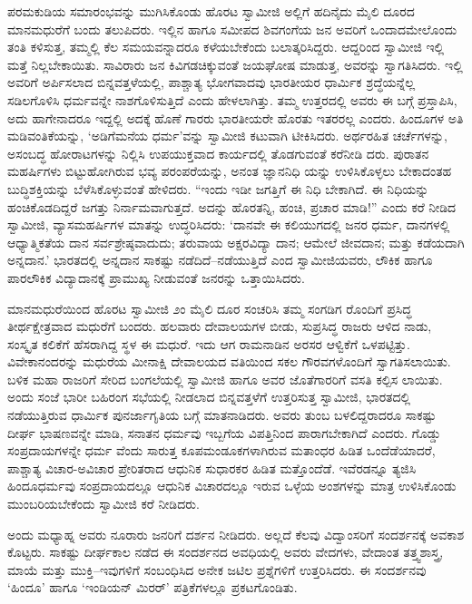 ಪರಮಕುಡಿಯ ಸಮಾರಂಭವನ್ನು ಮುಗಿಸಿಕೊಂಡು ಹೊರಟ ಸ್ವಾಮೀಜಿ ಅಲ್ಲಿಗೆ ಹದಿನೈದು ಮೈಲಿ ದೂರದ ಮಾನಮಧುರೆಗೆ ಬಂದು ತಲುಪಿದರು. ಇಲ್ಲಿನ ಹಾಗೂ ಸಮೀಪದ ಶಿವಗಂಗೆಯ ಜನ ಅವರಿಗೆ ಒಂದಾದಮೇಲೊಂದು ತಂತಿ ಕಳಿಸುತ್ತ, ತಮ್ಮಲ್ಲಿ ಕೆಲ ಸಮಯವನ್ನಾದರೂ ಕಳೆಯಬೇಕೆಂದು ಬಲಾತ್ಕರಿಸಿದ್ದರು. ಆದ್ದರಿಂದ ಸ್ವಾಮೀಜಿ ಇಲ್ಲಿ ಮತ್ತೆ ನಿಲ್ಲಬೇಕಾಯಿತು. ಸಾವಿರಾರು ಜನ ಕಿವಿಗಡಚಿಕ್ಕುವಂತೆ ಜಯಘೋಷ ಮಾಡುತ್ತ, ಅವರನ್ನು ಸ್ವಾಗತಿಸಿದರು. ಇಲ್ಲಿ ಅವರಿಗೆ ಅರ್ಪಿಸಲಾದ ಬಿನ್ನವತ್ತಳೆಯಲ್ಲಿ, ಪಾಶ್ಚಾತ್ಯ ಭೋಗವಾದವು ಭಾರತೀಯರ ಧಾರ್ಮಿಕ ಶ್ರದ್ಧೆಯನ್ನೆಲ್ಲ ಸಡಿಲಗೊಳಿಸಿ ಧರ್ಮವನ್ನೇ ನಾಶಗೊಳಿಸುತ್ತಿದೆ ಎಂದು ಹೇಳಲಾಗಿತ್ತು. ತಮ್ಮ ಉತ್ತರದಲ್ಲಿ ಅವರು ಈ ಬಗ್ಗೆ ಪ್ರಸ್ತಾಪಿಸಿ, ಅದು ಹಾಗೇನಾದರೂ ಇದ್ದಲ್ಲಿ ಅದಕ್ಕೆ ಹೊಣೆ ಗಾರರು ಭಾರತೀಯರೇ ಹೊರತು ಇತರರಲ್ಲ ಎಂದರು. ಹಿಂದೂಗಳ ಅತಿ ಮಡಿವಂತಿಕೆಯನ್ನು, ‘ಅಡಿಗೆಮನೆಯ ಧರ್ಮ’ವನ್ನು ಸ್ವಾಮೀಜಿ ಕಟುವಾಗಿ ಟೀಕಿಸಿದರು. ಅರ್ಥರಹಿತ ಚರ್ಚೆಗಳನ್ನು, ಅಸಂಬದ್ಧ ಹೋರಾಟಗಳನ್ನು ನಿಲ್ಲಿಸಿ ಉಪಯುಕ್ತವಾದ ಕಾರ್ಯದಲ್ಲಿ ತೊಡಗುವಂತೆ ಕರೆನೀಡಿ ದರು. ಪುರಾತನ ಮಹರ್ಷಿಗಳು ಬಿಟ್ಟುಹೋಗಿರುವ ಭವ್ಯ ಪರಂಪರೆಯನ್ನು, ಅನಂತ ಜ್ಞಾನನಿಧಿ ಯನ್ನು ಉಳಿಸಿಕೊಳ್ಳಲು ಬೇಕಾದಂತಹ ಬುದ್ಧಿಶಕ್ತಿಯನ್ನು ಬೆಳೆಸಿಕೊಳ್ಳುವಂತೆ ಹೇಳಿದರು. “ಇಂದು ಇಡೀ ಜಗತ್ತಿಗೆ ಈ ನಿಧಿ ಬೇಕಾಗಿದೆ. ಈ ನಿಧಿಯನ್ನು ಹಂಚಿಕೊಡದಿದ್ದರೆ ಜಗತ್ತು ನಿರ್ನಾಮವಾಗುತ್ತದೆ. ಅದನ್ನು ಹೊರತನ್ನಿ, ಹಂಚಿ, ಪ್ರಚಾರ ಮಾಡಿ!” ಎಂದು ಕರೆ ನೀಡಿದ ಸ್ವಾಮೀಜಿ, ವ್ಯಾಸಮಹರ್ಷಿಗಳ ಮಾತನ್ನು ಉದ್ಧರಿಸಿದರು: ‘ದಾನವೇ ಈ ಕಲಿಯುಗದಲ್ಲಿ ಜನರ ಧರ್ಮ, ದಾನಗಳಲ್ಲಿ ಆಧ್ಯಾತ್ಮಿಕತೆಯ ದಾನ ಸರ್ವಶ್ರೇಷ್ಠವಾದುದು; ತರುವಾಯ ಅಕ್ಷರವಿದ್ಯಾ ದಾನ; ಆಮೇಲೆ ಜೀವದಾನ; ಮತ್ತು ಕಡೆಯದಾಗಿ ಅನ್ನದಾನ.’ ಭಾರತದಲ್ಲಿ ಅನ್ನದಾನ ಸಾಕಷ್ಟು ನಡೆದಿದೆ–ನಡೆಯುತ್ತಿದೆ ಎಂದ ಸ್ವಾಮೀಜಿಯವರು, ಲೌಕಿಕ ಹಾಗೂ ಪಾರಲೌಕಿಕ ವಿದ್ಯಾದಾನಕ್ಕೆ ಪ್ರಾಮುಖ್ಯ ನೀಡುವಂತೆ ಜನರನ್ನು ಒತ್ತಾಯಿಸಿದರು.

ಮಾನಮಧುರೆಯಿಂದ ಹೊರಟ ಸ್ವಾಮೀಜಿ ೨ಂ ಮೈಲಿ ದೂರ ಸಂಚರಿಸಿ ತಮ್ಮ ಸಂಗಡಿಗ ರೊಂದಿಗೆ ಪ್ರಸಿದ್ಧ ತೀರ್ಥಕ್ಷೇತ್ರವಾದ ಮಧುರೆಗೆ ಬಂದರು. ಹಲವಾರು ದೇವಾಲಯಗಳ ಬೀಡು, ಸುಪ್ರಸಿದ್ಧ ರಾಜರು ಆಳಿದ ನಾಡು, ಸಂಸ್ಕೃತ ಕಲಿಕೆಗೆ ಹೆಸರಾಗಿದ್ದ ಸ್ಥಳ ಈ ಮಧುರೆ. ಇದು ಆಗ ರಾಮನಾಡಿನ ಅರಸರ ಆಳ್ವಿಕೆಗೆ ಒಳಪಟ್ಟಿತ್ತು. ವಿವೇಕಾನಂದರನ್ನು ಮಧುರೆಯ ಮೀನಾಕ್ಷಿ ದೇವಾಲಯದ ವತಿಯಿಂದ ಸಕಲ ಗೌರವಗಳೊಂದಿಗೆ ಸ್ವಾಗತಿಸಲಾಯಿತು. ಬಳಿಕ ಮಹಾ ರಾಜರಿಗೆ ಸೇರಿದ ಬಂಗಲೆಯಲ್ಲಿ ಸ್ವಾಮೀಜಿ ಹಾಗೂ ಅವರ ಜೊತೆಗಾರರಿಗೆ ವಸತಿ ಕಲ್ಪಿಸ ಲಾಯಿತು. ಅಂದು ಸಂಜೆ ಭಾರೀ ಬಹಿರಂಗ ಸಭೆಯಲ್ಲಿ ನೀಡಲಾದ ಬಿನ್ನವತ್ತಳೆಗೆ ಉತ್ತರಿಸುತ್ತ ಸ್ವಾಮೀಜಿ, ಭಾರತದಲ್ಲಿ ನಡೆಯುತ್ತಿರುವ ಧಾರ್ಮಿಕ ಪುನರ್ಜಾಗೃತಿಯ ಬಗ್ಗೆ ಮಾತನಾಡಿದರು. ಅವರು ತುಂಬ ಬಳಲಿದ್ದರಾದರೂ ಸಾಕಷ್ಟು ದೀರ್ಘ ಭಾಷಣವನ್ನೇ ಮಾಡಿ, ಸನಾತನ ಧರ್ಮವು ಇಬ್ಬಗೆಯ ವಿಪತ್ತಿನಿಂದ ಪಾರಾಗಬೇಕಾಗಿದೆ ಎಂದರು. ಗೊಡ್ಡು ಸಂಪ್ರದಾಯಗಳನ್ನೇ ಧರ್ಮ ವೆಂದು ಸಾರುತ್ತ ಕೂಪಮಂಡೂಕಗಳಾಗಿರುವ ಮತಾಂಧರ ಹಿಡಿತ ಒಂದೆಡೆಯಾದರೆ, ಪಾಶ್ಚಾತ್ಯ ವಿಚಾರ-ಅವಿಚಾರ ಪ್ರೇರಿತರಾದ ಆಧುನಿಕ ಸುಧಾರಕರ ಹಿಡಿತ ಮತ್ತೊಂದೆಡೆ. ಇವೆರಡನ್ನೂ ತ್ಯಜಿಸಿ ಹಿಂದೂಧರ್ಮವು ಸಂಪ್ರದಾಯದಲ್ಲೂ ಆಧುನಿಕ ವಿಚಾರದಲ್ಲೂ ಇರುವ ಒಳ್ಳೆಯ ಅಂಶಗಳನ್ನು ಮಾತ್ರ ಉಳಿಸಿಕೊಂಡು ಮುಂಬರಿಯಬೇಕೆಂದು ಸ್ವಾಮೀಜಿ ಕರೆ ನೀಡಿದರು.

ಅಂದು ಮಧ್ಯಾಹ್ನ ಅವರು ನೂರಾರು ಜನರಿಗೆ ದರ್ಶನ ನೀಡಿದರು. ಅಲ್ಲದೆ ಕೆಲವು ವಿದ್ವಾಂಸರಿಗೆ ಸಂದರ್ಶನಕ್ಕೆ ಅವಕಾಶ ಕೊಟ್ಟರು. ಸಾಕಷ್ಟು ದೀರ್ಘಕಾಲ ನಡೆದ ಈ ಸಂದರ್ಶನದ ಅವಧಿಯಲ್ಲಿ ಅವರು ವೇದಗಳು, ವೇದಾಂತ ತತ್ತ್ವಶಾಸ್ತ್ರ, ಮಾಯೆ ಮತ್ತು ಮುಕ್ತಿ–ಇವುಗಳಿಗೆ ಸಂಬಂಧಿಸಿದ ಅನೇಕ ಜಟಿಲ ಪ್ರಶ್ನೆಗಳಿಗೆ ಉತ್ತರಿಸಿದರು. ಈ ಸಂದರ್ಶನವು ‘ಹಿಂದೂ’ ಹಾಗೂ ‘ಇಂಡಿಯನ್ ಮಿರರ್​’ ಪತ್ರಿಕೆಗಳಲ್ಲೂ ಪ್ರಕಟಗೊಂಡಿತು.

